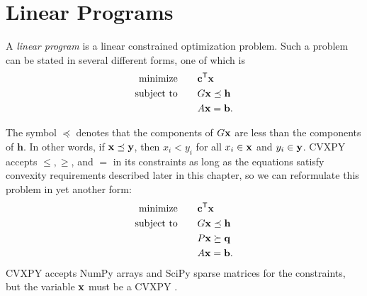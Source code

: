 
\section*{Linear Programs} %

A \emph{linear program} is a linear constrained optimization problem. Such a problem can be stated in several
different forms, one of which is
\begin{align*}
\text{minimize}\qquad &\mathbf{c}^{\mathsf T} \mathbf{x} \\
\text{subject to}\qquad &G\mathbf{x} \preceq \mathbf{h}\\
&A\mathbf{x} = \mathbf{b}.
\end{align*}

The symbol $\preceq$ denotes that the components of $G\mathbf{x}$ are less than the components of $\mathbf{h}$.
In other words, if $\mathbf{x}\preceq\mathbf{y}$, then $x_i < y_i$ for all $x_i\in\mathbf{x}$ and $y_i\in\mathbf{y}$. 
CVXPY accepts  $\leq, \geq$, and $=$ in its constraints as long as the equations satisfy convexity requirements described later in this chapter, so we can reformulate this problem in yet another form:
\begin{align*}
\text{minimize}\qquad &\mathbf{c}^{\mathsf T} \mathbf{x} \\
\text{subject to}\qquad &G\mathbf{x} \preceq \mathbf{h}\\
&P\mathbf{x} \succeq \mathbf{q}\\
&A\mathbf{x} = \mathbf{b}.
\end{align*}
CVXPY accepts NumPy arrays and SciPy sparse matrices for the constraints, but the variable $\mathbf{x}$ must be a CVXPY .

\begin{comment}
The corresponding \emph{dual program} for the above linear program has the form
\begin{align*}
\text{maximize}\qquad &-h\trp z - b\trp y \\
\text{subject to}\qquad &G\trp z + A\trp y + c = 0\\
 &z \geq 0.
\end{align*}
CVXOPT provides functions to solve both the original (\emph{primal}) linear program and its dual program.
\end{comment}

